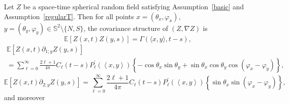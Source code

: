 \documentclass[AHL,Unicode,longabstracts,published]{cedram}
\newcommand{\bbS}{\mathbb{S}}
\newcommand{\bbE}{\mathbb{E}}
\begin{document}
\begin{lemm}\label{lemcov}
Let $Z$ be a space-time spherical random field satisfying Assumption~\ref{basic} and Assumption~\ref{regularT}. Then for all points $x=(\theta _{x},\varphi _{x}),$ $y=(\theta _{y},\varphi _{y})\in \bbS^{2}\setminus \{N,S\}$, the covariance structure of $(Z, \nabla Z)$ is
\[
\bbE\left[Z(x,t)Z(y,s)\right] = \Gamma(\langle x, y\rangle, t-s),
\]
\begin{multline*}
\bbE\left[Z(x,t)\partial _{1;y}Z(y,s)\right]
\\
=\sum_{\ell =0}^{\infty }\frac{2\ell +1}{4\pi }C_{\ell }(t-s)P_{\ell }^{\prime }(\left\langle x,y\right\rangle)\left\{ -\cos \theta _{x}\sin
\theta _{y}+\sin \theta _{x}\cos \theta _{y}\cos (\varphi _{x}-\varphi _{y})\right\} \text{,}
\end{multline*}
\begin{equation*}
\bbE\left[Z(x,t)\partial _{2;y}Z(y,s)\right]
=\sum_{\ell =0}^{\infty }\frac{2\ell +1}{4\pi }C_{\ell }(t-s)P_{\ell }^{\prime }(\left\langle x,y\right\rangle)\left\{ \sin \theta _{x}\sin (\varphi _{x}-\varphi _{y})\right\} \text{,}
\end{equation*}
and moreover


\end{lemm}
\end{document}
